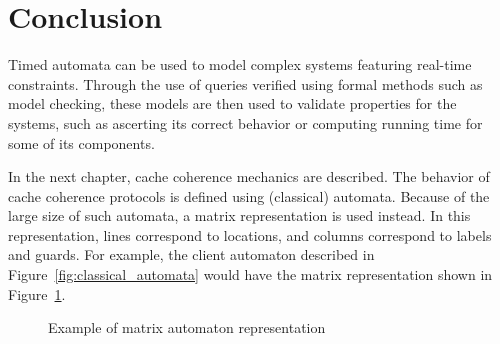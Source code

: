 \section{Conclusion}
Timed automata can be used to model complex systems featuring real-time
constraints. Through the use of queries verified using formal methods such as
model checking, these models are then used to validate properties for the
systems, such as ascerting its correct behavior or computing running time for
some of its components.

In the next chapter, cache coherence mechanics are described. The behavior of
cache coherence protocols is defined using (classical) automata. Because of the
large size of such automata, a matrix representation is used instead. In this
representation, lines correspond to locations, and columns correspond to labels
and guards. For example, the client automaton described in
Figure~\ref{fig:classical_automata} would have the matrix
representation shown in Figure~\ref{fig:matrix_example}.

\begin{figure}[hbt!]
   \centering
   
   \caption{Example of matrix automaton representation}
   \label{fig:matrix_example}
\end{figure}
